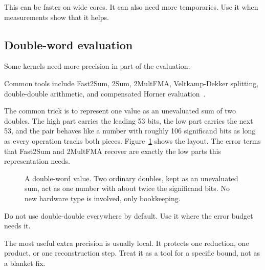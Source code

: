 \documentclass[manuscript, nonacm]{acmart}
\begin{document}
  This can be faster on wide cores. It can also need more temporaries. Use it
  when measurements show that it helps.

  \subsection{Double-word evaluation}

  Some kernels need more precision in part of the evaluation.

  Common tools include Fast2Sum, 2Sum, 2MultFMA, Veltkamp-Dekker splitting,
  double-double arithmetic, and compensated Horner evaluation~\cite{muller,handbook}.

  The common trick is to represent one value as an unevaluated sum of two
  doubles. The high part carries the leading 53 bits, the low part carries
  the next 53, and the pair behaves like a number with roughly 106
  significand bits as long as every operation tracks both pieces.
  Figure~\ref{fig:doubleword} shows the layout. The error terms that
  Fast2Sum and 2MultFMA recover are exactly the low parts this
  representation needs.

  \begin{figure}[tbp]
    \centering
    \caption{A double-word value. Two ordinary doubles, kept as an
    unevaluated sum, act as one number with about twice the significand
    bits. No new hardware type is involved, only bookkeeping.}
    \label{fig:doubleword}
  \end{figure}

  Do not use double-double everywhere by default. Use it where the error
  budget needs it.

  The most useful extra precision is usually local. It protects one reduction,
  one product, or one reconstruction step. Treat it as a tool for a specific
  bound, not as a blanket fix.
\end{document}
